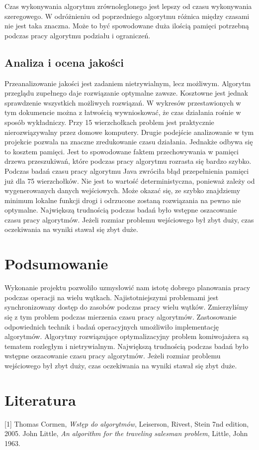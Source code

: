 \documentclass{article}
\begin{document}
	Czas wykonywania algorytmu zrównoleglonego jest lepszy od czasu wykonywania szeregowego. W odróżnieniu od poprzedniego algorytmu różnica między czasami nie jest taka znaczna. Może to być spowodowane duża ilością pamięci potrzebną podczas pracy algorytmu podziału i ograniczeń. 
	
	
	\subsection{Analiza i ocena jakości}
		Przeanalizowanie jakości jest zadaniem nietrywialnym, lecz możliwym. Algorytm przeglądu zupełnego daje rozwiązanie optymalne zawsze. Kosztowne jest jednak sprawdzenie wszystkich możliwych rozwiązań. W wykresów przestawionych w tym dokumencie można z łatwością wywnioskować, że czas działania rośnie w sposób wykładniczy. Przy 15 wierzchołkach problem jest praktycznie nierozwiązywalny przez domowe komputery. Drugie podejście analizowanie w tym projekcie pozwala na znaczne zredukowanie czasu działania. Jednakże odbywa się to kosztem pamięci. Jest to spowodowane faktem przechowywania w pamięci drzewa przeszukiwań, które podczas pracy algorytmu rozrasta się bardzo szybko. Podczas badań czasu pracy algorytmu Java zwróciła błąd przepełnienia pamięci już dla 75 wierzchołków. Nie jest to wartość deterministyczna, ponieważ zależy od wygenerowanych danych wejściowych. Może okazać się, ze szybko znajdziemy minimum lokalne funkcji drogi i odrzucone zostaną rozwiązania na pewno nie optymalne. Największą trudnością podczas badań było wstępne oszacowanie czasu pracy algorytmów. Jeżeli rozmiar problemu wejściowego był zbyt duży, czas oczekiwania na wyniki stawał się zbyt duże.
		\newpage
\section{Podsumowanie}
	Wykonanie projektu pozwoliło uzmysłowić nam istotę dobrego planowania pracy podczas operacji na wielu wątkach. Najistotniejszymi problemami jest synchronizowany dostęp do zasobów podczas pracy wielu wątków. Zmierzyliśmy się z tym problem podczas mierzenia czasu pracy algorytmów. Zastosowanie odpowiednich technik i badań operacyjnych umożliwiło implementację algorytmów. Algorytmy rozwiązujące optymalizacyjny problem komiwojażera są tematem rozległym i nietrywialnym. Największą trudnością podczas badań było wstępne oszacowanie czasu pracy algorytmów. Jeżeli rozmiar problemu wejściowego był zbyt duży, czas oczekiwania na wyniki stawał się zbyt duże.
	\newpage
\section*{Literatura}
[1] Thomas Cormen, \emph{Wstęp do algorytmów}, Leiserson, Rivest, Stein 7nd edition, 2005. \newline [2] John Little, \emph{An algorithm for the traveling salesman problem}, Little, John 1963.
\end{document}
